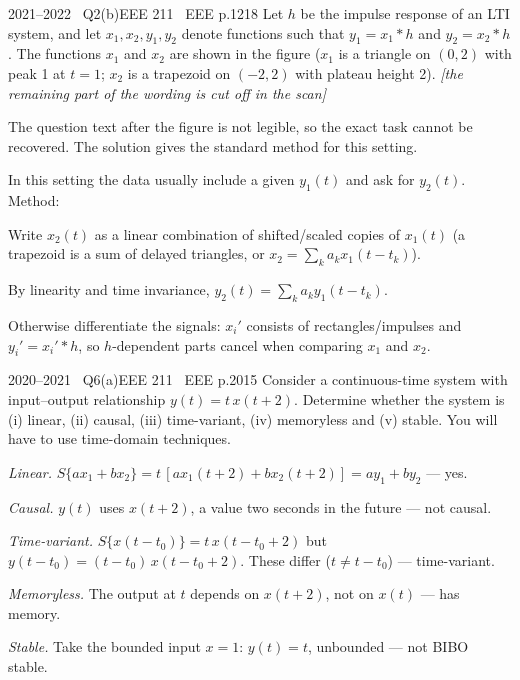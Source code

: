 \begin{qcard}{2021--2022 \textbullet\ Q2(b)}{EEE 211 \textbullet\ EEE p.12}{18}
Let $h$ be the impulse response of an LTI system, and let $x_1,x_2,y_1,y_2$ denote functions such that $y_1=x_1*h$ and $y_2=x_2*h$. The functions $x_1$ and $x_2$ are shown in the figure ($x_1$ is a triangle on $(0,2)$ with peak 1 at $t=1$; $x_2$ is a trapezoid on $(-2,2)$ with plateau height 2). \emph{[the remaining part of the wording is cut off in the scan]}
\end{qcard}
\begin{notebox}The question text after the figure is not legible, so the exact task cannot be recovered. The solution gives the standard method for this setting.\end{notebox}
\begin{solution}
In this setting the data usually include a given $y_1(t)$ and ask for $y_2(t)$. Method:
\begin{steps}
\item Write $x_2(t)$ as a linear combination of shifted/scaled copies of $x_1(t)$ (a trapezoid is a sum of delayed triangles, or $x_2=\sum_ka_kx_1(t-t_k)$).
\item By linearity and time invariance, $y_2(t)=\sum_ka_ky_1(t-t_k)$.
\item Otherwise differentiate the signals: $x_i'$ consists of rectangles/impulses and $y_i'=x_i'*h$, so $h$-dependent parts cancel when comparing $x_1$ and $x_2$.
\end{steps}
\end{solution}

\begin{qcard}{2020--2021 \textbullet\ Q6(a)}{EEE 211 \textbullet\ EEE p.20}{15}
Consider a continuous-time system with input--output relationship $y(t)=t\,x(t+2)$. Determine whether the system is (i) linear, (ii) causal, (iii) time-variant, (iv) memoryless and (v) stable. You will have to use time-domain techniques.
\end{qcard}
\begin{solution}
\begin{steps}
\item \emph{Linear.} $S\{ax_1+bx_2\}=t\,[ax_1(t+2)+bx_2(t+2)]=ay_1+by_2$ --- yes.
\item \emph{Causal.} $y(t)$ uses $x(t+2)$, a value two seconds in the future --- not causal.
\item \emph{Time-variant.} $S\{x(t-t_0)\}=t\,x(t-t_0+2)$ but $y(t-t_0)=(t-t_0)\,x(t-t_0+2)$. These differ ($t\ne t-t_0$) --- time-variant.
\item \emph{Memoryless.} The output at $t$ depends on $x(t+2)$, not on $x(t)$ --- has memory.
\item \emph{Stable.} Take the bounded input $x=1$: $y(t)=t$, unbounded --- not BIBO stable.
\end{steps}
\end{solution}


